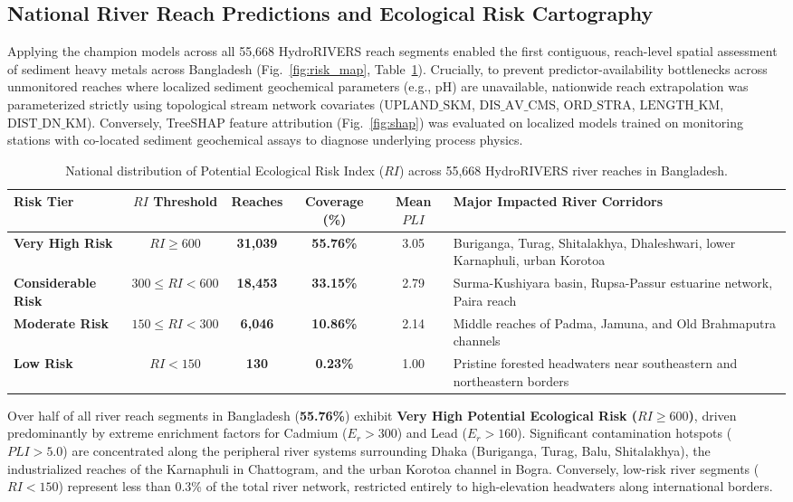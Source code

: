\documentclass[authoryear,preprint,12pt]{elsarticle}
\begin{document}
\subsection{National River Reach Predictions and Ecological Risk Cartography}
Applying the champion models across all 55,668 HydroRIVERS reach segments enabled the first contiguous, reach-level spatial assessment of sediment heavy metals across Bangladesh (Fig.~\ref{fig:risk_map}, Table~\ref{tab:risk}). Crucially, to prevent predictor-availability bottlenecks across unmonitored reaches where localized sediment geochemical parameters (e.g., pH) are unavailable, nationwide reach extrapolation was parameterized strictly using topological stream network covariates ($\text{UPLAND\_SKM}$, $\text{DIS\_AV\_CMS}$, $\text{ORD\_STRA}$, $\text{LENGTH\_KM}$, $\text{DIST\_DN\_KM}$). Conversely, TreeSHAP feature attribution (Fig.~\ref{fig:shap}) was evaluated on localized models trained on monitoring stations with co-located sediment geochemical assays to diagnose underlying process physics.

\begin{table}[htbp]
\centering
\small
\caption{National distribution of Potential Ecological Risk Index ($RI$) across 55,668 HydroRIVERS river reaches in Bangladesh.}
\label{tab:risk}
\begin{tabularx}{\textwidth}{lccccX}
\toprule
Risk Tier & $RI$ Threshold & Reaches & Coverage (\%) & Mean $PLI$ & Major Impacted River Corridors \\
\midrule
\textbf{Very High Risk} & $RI \ge 600$ & \textbf{31,039} & \textbf{55.76\%} & 3.05 & Buriganga, Turag, Shitalakhya, Dhaleshwari, lower Karnaphuli, urban Korotoa \\
\textbf{Considerable Risk} & $300 \le RI < 600$ & \textbf{18,453} & \textbf{33.15\%} & 2.79 & Surma-Kushiyara basin, Rupsa-Passur estuarine network, Paira reach \\
\textbf{Moderate Risk} & $150 \le RI < 300$ & \textbf{6,046} & \textbf{10.86\%} & 2.14 & Middle reaches of Padma, Jamuna, and Old Brahmaputra channels \\
\textbf{Low Risk} & $RI < 150$ & \textbf{130} & \textbf{0.23\%} & 1.00 & Pristine forested headwaters near southeastern and northeastern borders \\
\bottomrule
\end{tabularx}
\end{table}

Over half of all river reach segments in Bangladesh (\textbf{55.76\%}) exhibit \textbf{Very High Potential Ecological Risk ($RI \ge 600$)}, driven predominantly by extreme enrichment factors for Cadmium ($E_r > 300$) and Lead ($E_r > 160$). Significant contamination hotspots ($PLI > 5.0$) are concentrated along the peripheral river systems surrounding Dhaka (Buriganga, Turag, Balu, Shitalakhya), the industrialized reaches of the Karnaphuli in Chattogram, and the urban Korotoa channel in Bogra. Conversely, low-risk river segments ($RI < 150$) represent less than 0.3\% of the total river network, restricted entirely to high-elevation headwaters along international borders. 
\end{document}
